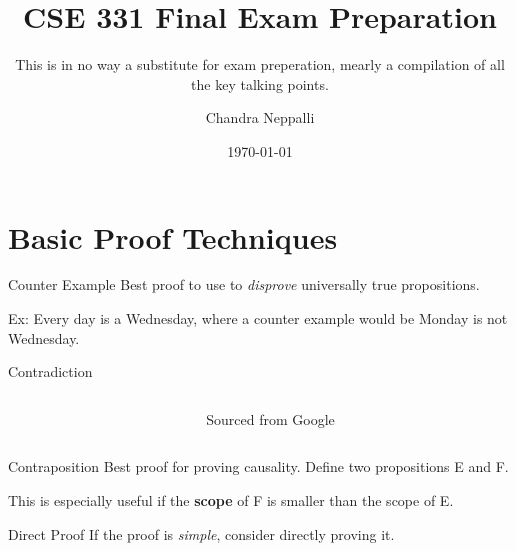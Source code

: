\documentclass{beamer}
\title{CSE 331 Final Exam Preparation}
\subtitle{This is in no way a substitute for exam preperation, mearly a compilation of all the key talking points.}
\author{Chandra Neppalli}
\date{\today}
\newcommand{\defineFigureReflected}[4]{
    \begin{figure}[h]
        \centering
        \reflectbox{\texttt{[image: \#1]}}
        \caption{#3}
        \label{fig:#4}
    \end{figure}
}
\begin{document}
    \maketitle
    \section{Basic Proof Techniques}
    \begin{frame}{Counter Example}  
        Best proof to use to \textit{disprove} universally true propositions.
        \bigskip

        Ex: Every day is a Wednesday, where a counter example would be Monday is not Wednesday.
    \end{frame}
    \begin{frame}{Contradiction}
        \begin{columns}
            \begin{column}{0.5\textwidth}
                \bigskip
        
                \bigskip
        
            \end{column}
            \begin{column}{0.5\textwidth}
                \defineFigureReflected
                {contradiction}{0.75}
                {Sourced from Google}{phoenixwright}
            \end{column}
        \end{columns}
           
    \end{frame}
    \begin{frame}{Contraposition}
        Best proof for proving causality. Define two propositions E and F.
        \bigskip

        \bigskip

        This is especially useful if the \textbf{scope} of F is smaller than the scope of E.
    \end{frame}
    \begin{frame}{Direct Proof}\label{frame:directproof}
        If the proof is \textit{simple}, consider directly proving it.
        \bigskip

    \end{frame}
\end{document}
